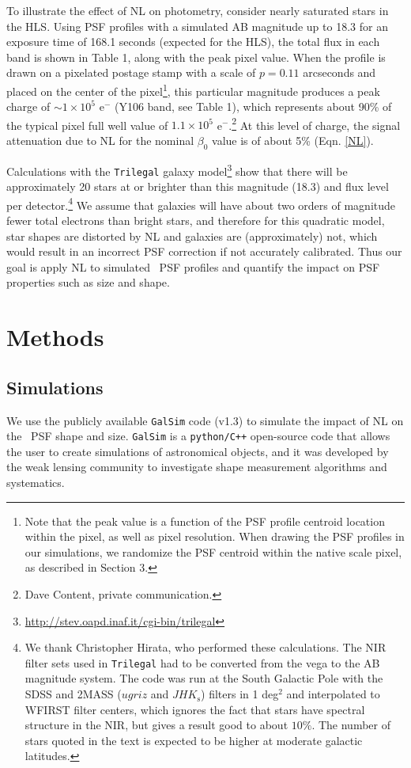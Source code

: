 \documentclass[11pt,preprint,flushrt]{aastex}
\begin{document}
To illustrate the effect of NL on photometry, consider nearly saturated stars in the HLS.  Using PSF profiles with a simulated AB magnitude up to 18.3 for an exposure time of 168.1 seconds (expected for the HLS), the total flux in each band is shown in Table 1, along with the peak pixel value. When the profile is drawn on a pixelated postage stamp with a scale of $p=0.11$ arcseconds and placed on the center of the pixel\footnote{Note that the peak value is a function of the PSF profile centroid location within the pixel, as well as pixel resolution. When drawing the PSF profiles in our simulations, we randomize the PSF centroid within the native scale pixel, as described in Section 3.}, this particular magnitude produces a peak charge of $\sim 1\times 10^5$ e$^{-}$ (Y106 band, see Table 1), which represents about 90\% of the typical pixel full well value of $1.1 \times 10^5$ e$^{-}$.\footnote{Dave Content, private communication.}
At this level of charge, the signal attenuation due to NL for the nominal $\beta_0$ value is of about 5\% (Eqn. \ref{NL}). 

Calculations with the {\tt{Trilegal}} galaxy model\footnote{\url{http://stev.oapd.inaf.it/cgi-bin/trilegal}} \citep{girardi12} show that there will be approximately 20 stars at or brighter than this magnitude (18.3) and flux level per detector.\footnote{We thank Christopher Hirata, who performed these calculations. The NIR filter sets used in {\tt{Trilegal}} had to be converted from the vega to the AB magnitude system. The code was run at the South Galactic Pole with the SDSS and 2MASS ($ugriz$ and $JHK_\mathrm{s}$) filters in 1 deg$^2$ and interpolated to WFIRST filter centers, which ignores the fact that stars have spectral structure in the NIR, but gives a result good to about $10\%$. The number of stars quoted in the text is expected to be higher at moderate galactic latitudes.} We assume that galaxies will have about two orders of magnitude fewer total electrons than bright stars, and therefore for this quadratic model, star shapes are distorted by NL and galaxies are (approximately) not, which would result in an incorrect PSF correction if not accurately calibrated. Thus our goal is apply NL to simulated \wfa\ PSF profiles and quantify the impact on PSF properties such as size and shape. 

\section{Methods}
\label{methods}
\subsection {Simulations}
We use the publicly available {\tt{GalSim}} code (v1.3) to simulate the impact of NL on the \wfa\ PSF shape and size. {\tt{GalSim}} is a {\tt{python/C++}} open-source code that allows the user to create simulations of astronomical objects, and it was developed by the weak lensing community to investigate shape measurement algorithms and systematics. 
\end{document}
